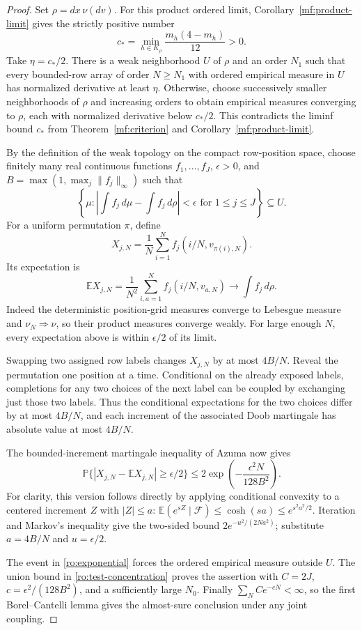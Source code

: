 \begin{proof}
Set \(\rho=dx\,\nu(dv)\). For this product ordered limit,
Corollary~\ref{mf:product-limit} gives the strictly positive number
\[
 c_* =\min_{h\in K_\rho}\frac{m_h(4-m_h)}{12}>0.
\]
Take \(\eta=c_*/2\). There is a weak neighborhood \(U\) of
\(\rho\) and an order \(N_1\) such that every bounded-row array
of order \(N\ge N_1\) with ordered empirical measure in \(U\)
has normalized derivative at least \(\eta\). Otherwise, choose
successively smaller neighborhoods of \(\rho\) and increasing
orders to obtain empirical measures converging to \(\rho\), each
with normalized derivative below \(c_*/2\). This contradicts the
liminf bound \(c_*\) from Theorem~\ref{mf:criterion} and
Corollary~\ref{mf:product-limit}.

By the definition of the weak topology on the compact row-position
space, choose finitely many real continuous functions
\(f_1,\ldots,f_J\), \(\epsilon>0\), and
\(B=\max(1,\max_j\|f_j\|_\infty)\) such that
\[
 \left\{\mu:
  \left|\int f_j\,d\mu-\int f_j\,d\rho\right|<\epsilon
                 \text{ for }1\le j\le J\right\}\subseteq U.
\]
For a uniform permutation \(\pi\), define
\[
 X_{j,N}=\frac1N\sum_{i=1}^N f_j(i/N,v_{\pi(i),N}).
\]
Its expectation is
\[
 \mathbb EX_{j,N}
 =\frac1{N^2}\sum_{i,a=1}^N f_j(i/N,v_{a,N})
 \longrightarrow\int f_j\,d\rho.
\]
Indeed the deterministic position-grid measures converge to Lebesgue
measure and \(\nu_N\Longrightarrow\nu\), so their product measures
converge weakly. For large enough \(N\), every expectation above is
within \(\epsilon/2\) of its limit.

Swapping two assigned row labels changes \(X_{j,N}\) by at most
\(4B/N\). Reveal the permutation one position at a time. Conditional
on the already exposed labels, completions for any two choices of
the next label can be coupled by exchanging just those two labels.
Thus the conditional expectations for the two choices differ by at
most \(4B/N\), and each increment of the associated Doob martingale
has absolute value at most \(4B/N\).

The bounded-increment martingale inequality of Azuma
\cite{Azuma1967} now gives
\begin{equation}\label{ro:test-concentration}
 \mathbb P\{|X_{j,N}-\mathbb EX_{j,N}|\ge\epsilon/2\}
 \le2\exp\left(-\frac{\epsilon^2N}{128B^2}\right).
\end{equation}
For clarity, this version follows directly by applying conditional
convexity to a centered increment \(Z\) with \(|Z|\le a\):
\(\mathbb E(e^{sZ}\mid\mathcal F)\le\cosh(sa)
\le e^{s^2a^2/2}\). Iteration and Markov's inequality give the
two-sided bound \(2e^{-u^2/(2Na^2)}\); substitute
\(a=4B/N\) and \(u=\epsilon/2\).

The event in \eqref{ro:exponential} forces the ordered empirical
measure outside \(U\). The union bound in
\eqref{ro:test-concentration} proves the assertion with
\(C=2J\), \(c=\epsilon^2/(128B^2)\), and a sufficiently large
\(N_0\). Finally \(\sum_NCe^{-cN}<\infty\), so the first
Borel--Cantelli lemma gives the almost-sure conclusion under any
joint coupling.
\end{proof}

